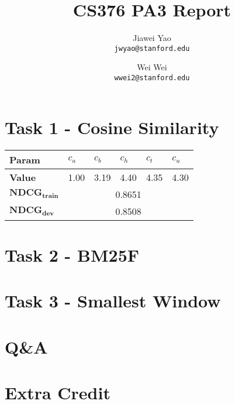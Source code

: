 \documentclass{article}
\begin{document}
\title{CS376 PA3 Report}

\author{
  Jiawei Yao\\
  \texttt{jwyao@stanford.edu}
  \and
  Wei Wei\\
  \texttt{wwei2@stanford.edu}
}

\maketitle

\section{Task 1 - Cosine Similarity}

\begin{center}
    \begin{tabular}{ | l | l | l | l | l | l |}
    \hline
    \textbf{Param} & $c_a$ & $c_b$ & $c_h$ & $c_t$ & $c_u$ \\
    \hline
    \textbf{Value} & 1.00 & 3.19 & 4.40 & 4.35 & 4.30 \\
    \hline
    $\mathbf{NDCG_{train}}$ & \multicolumn{5}{c|}{0.8651} \\
    \hline
    $\mathbf{NDCG_{dev}}$ & \multicolumn{5}{c|}{0.8508} \\
    \hline
    \end{tabular}
\end{center}

\section{Task 2 - BM25F}

\section{Task 3 - Smallest Window}

\section{Q\&A}

\section{Extra Credit}
\end{document}

